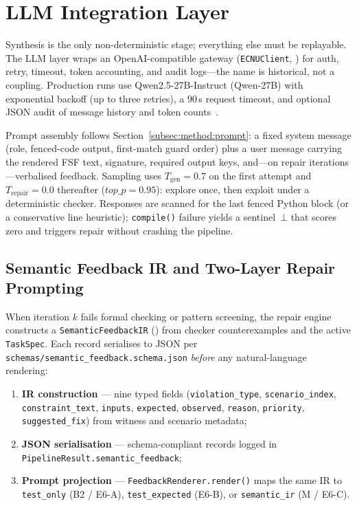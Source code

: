 \section{LLM Integration Layer}
\label{sec:impl:llm}

Synthesis is the only non-deterministic stage; everything else must be
replayable.
The LLM layer wraps an OpenAI-compatible gateway
(\texttt{ECNUClient}, ) for auth, retry, timeout,
token accounting, and audit logs---the name is historical, not a coupling.
Production runs use Qwen2.5-27B-Instruct (\textsf{Qwen-27B}) with exponential
backoff (up to three retries), a 90\,s request timeout, and optional JSON
audit of message history and token counts~\citep{openai2023gpt4,chen2021codex}.

Prompt assembly follows Section~\ref{subsec:method:prompt}: a fixed system
message (role, fenced-code output, first-match guard order) plus a user
message carrying the rendered FSF text, signature, required output keys, and---on
repair iterations---verbalised feedback.
Sampling uses $T_\text{gen}{=}0.7$ on the first attempt and
$T_\text{repair}{=}0.0$ thereafter ($\mathit{top\_p}{=}0.95$): explore once,
then exploit under a deterministic checker.
Responses are scanned for the last fenced Python block (or a conservative
line heuristic); \texttt{compile()} failure yields a sentinel~$\bot$ that
scores zero and triggers repair without crashing the pipeline.

\subsection{Semantic Feedback IR and Two-Layer Repair Prompting}
\label{sec:impl:repair-feedback}

When iteration $k$ fails formal checking or pattern screening, the repair
engine constructs a \texttt{SemanticFeedbackIR}
() from checker counterexamples and the
active \texttt{TaskSpec}.
Each record serialises to JSON per
\texttt{schemas/semantic\_feedback.schema.json} \emph{before} any
natural-language rendering:
\begin{enumerate}
  \item \textbf{IR construction} --- nine typed fields
        (\texttt{violation\_type}, \texttt{scenario\_index},
        \texttt{constraint\_text}, \texttt{inputs}, \texttt{expected},
        \texttt{observed}, \texttt{reason}, \texttt{priority},
        \texttt{suggested\_fix}) from witness and scenario metadata;
  \item \textbf{JSON serialisation} --- schema-compliant records logged in
        \texttt{PipelineResult.semantic\_feedback};
  \item \textbf{Prompt projection} --- \texttt{FeedbackRenderer.render()}
        maps the same IR to \texttt{test\_only} (B2 / E6-A),
        \texttt{test\_expected} (E6-B), or \texttt{semantic\_ir} (M / E6-C).
\end{enumerate}

